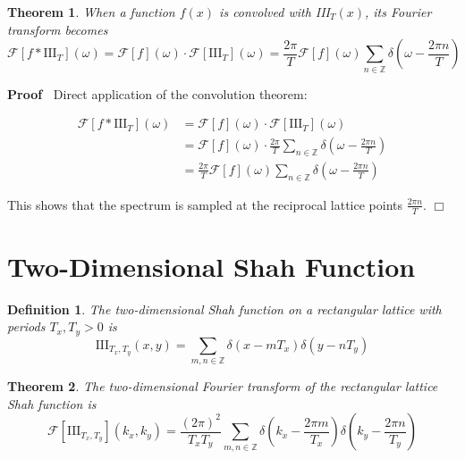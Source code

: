 \documentclass{article}
\newenvironment{proof}{\noindent\textbf{Proof\ }}{\hspace*{\fill}$\Box$\medskip}
\newtheorem{definition}{Definition}
\newtheorem{theorem}{Theorem}
\begin{document}
\begin{theorem}
  \label{thm:periodization_spectrum}When a function $f (x)$ is convolved with
  III$_T (x)$, its Fourier transform becomes
  \begin{equation}
    \label{eq:periodization_spectrum} \mathcal{F}[f \ast \text{III}_T]
    (\omega) =\mathcal{F} [f] (\omega) \cdot \mathcal{F} [\text{III}_T]
    (\omega) = \frac{2 \pi}{T} \mathcal{F} [f] (\omega)  \sum_{n \in
    \mathbb{Z}} \delta \left( \omega - \frac{2 \pi n}{T} \right)
  \end{equation}
\end{theorem}

\begin{proof}
  Direct application of the convolution theorem:
  
  \begin{align}
    \mathcal{F}[f \ast \text{III}_T] (\omega) & =\mathcal{F} [f] (\omega)
    \cdot \mathcal{F} [\text{III}_T] (\omega)  \label{eq:product_theorem}\\
    & =\mathcal{F} [f] (\omega) \cdot \frac{2 \pi}{T}  \sum_{n \in
    \mathbb{Z}} \delta \left( \omega - \frac{2 \pi n}{T} \right) 
    \label{eq:substitute_shah_transform}\\
    & = \frac{2 \pi}{T} \mathcal{F} [f] (\omega)  \sum_{n \in \mathbb{Z}}
    \delta \left( \omega - \frac{2 \pi n}{T} \right)  \label{eq:distribute_f}
  \end{align}
  
  This shows that the spectrum is sampled at the reciprocal lattice points
  $\frac{2 \pi n}{T}$.
\end{proof}

\section{Two-Dimensional Shah Function}

\begin{definition}
  \label{def:shah_2d}The two-dimensional Shah function on a rectangular
  lattice with periods $T_x, T_y > 0$ is
  \begin{equation}
    \label{eq:shah_2d} \text{III}_{T_x, T_y} (x, y) = \sum_{m, n \in
    \mathbb{Z}} \delta (x - mT_x) \delta (y - nT_y)
  \end{equation}
\end{definition}

\begin{theorem}
  \label{thm:shah_2d_fourier}The two-dimensional Fourier transform of the
  rectangular lattice Shah function is
  \begin{equation}
    \label{eq:shah_2d_fourier} \mathcal{F} [\text{III}_{T_x, T_y}] (k_x, k_y)
    = \frac{(2 \pi)^2}{T_x T_y}  \sum_{m, n \in \mathbb{Z}} \delta \left( k_x
    - \frac{2 \pi m}{T_x} \right) \delta \left( k_y - \frac{2 \pi n}{T_y}
    \right)
  \end{equation}
\end{theorem}
\end{document}
